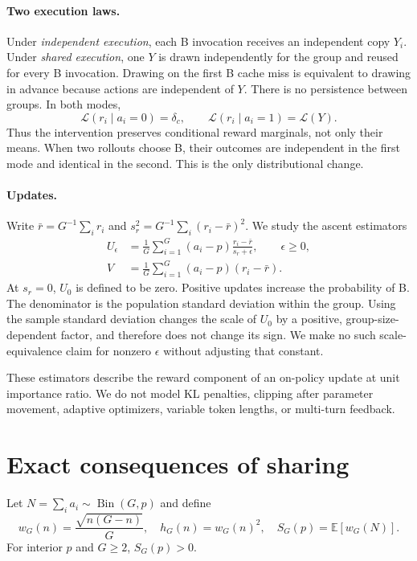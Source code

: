 \documentclass[10pt,letterpaper]{article}
\newcommand{\E}{\mathbb{E}}
\newcommand{\Bin}{\operatorname{Bin}}
\begin{document}
\paragraph{Two execution laws.}
Under \emph{independent execution}, each B invocation receives an independent
copy $Y_i$. Under \emph{shared execution}, one $Y$ is drawn independently for
the group and reused for every B invocation. Drawing on the first B cache miss
is equivalent to drawing in advance because actions are independent of $Y$.
There is no persistence between groups. In both modes,
\begin{equation}
\mathcal L(r_i\mid a_i=0)=\delta_c,\qquad
\mathcal L(r_i\mid a_i=1)=\mathcal L(Y).
\label{eq:marginals}
\end{equation}
Thus the intervention preserves conditional reward marginals, not only their
means. When two rollouts choose B, their outcomes are independent in the first
mode and identical in the second. This is the only distributional change.

\paragraph{Updates.}
Write $\bar r=G^{-1}\sum_i r_i$ and
$s_r^2=G^{-1}\sum_i(r_i-\bar r)^2$. We study the ascent estimators
\begin{align}
U_\epsilon&=\frac1G\sum_{i=1}^G
 (a_i-p)\frac{r_i-\bar r}{s_r+\epsilon},\qquad \epsilon\geq0,
\label{eq:norm}\\
V&=\frac1G\sum_{i=1}^G(a_i-p)(r_i-\bar r).
\label{eq:centered}
\end{align}
At $s_r=0$, $U_0$ is defined to be zero. Positive updates increase the
probability of B. The denominator is the population standard deviation within
the group. Using the sample standard deviation changes the scale of $U_0$ by
a positive, group-size-dependent factor, and therefore does not change its
sign. We make no such scale-equivalence claim for nonzero $\epsilon$ without
adjusting that constant.

These estimators describe the reward component of an on-policy update at unit
importance ratio. We do not model KL penalties, clipping after parameter
movement, adaptive optimizers, variable token lengths, or multi-turn feedback.

\section{Exact consequences of sharing}
Let $N=\sum_i a_i\sim\Bin(G,p)$ and define
\begin{equation}
w_G(n)=\frac{\sqrt{n(G-n)}}{G},\quad
h_G(n)=w_G(n)^2,\quad S_G(p)=\E[w_G(N)].
\label{eq:weights}
\end{equation}
For interior $p$ and $G\geq2$, $S_G(p)>0$.
\end{document}
